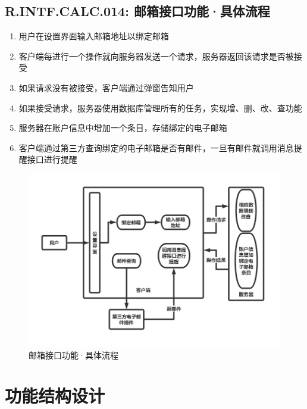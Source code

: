     \subsection{R.INTF.CALC.014: 邮箱接口功能·具体流程}
    \begin{enumerate}
        \item 用户在设置界面输入邮箱地址以绑定邮箱
        \item 客户端每进行一个操作就向服务器发送一个请求，服务器返回该请求是否被接受
        \item 如果请求没有被接受，客户端通过弹窗告知用户
        \item 如果接受请求，服务器使用数据库管理所有的任务，实现增、删、改、查功能
        \item 服务器在账户信息中增加一个条目，存储绑定的电子邮箱
        \item 客户端通过第三方查询绑定的电子邮箱是否有邮件，一旦有邮件就调用消息提醒接口进行提醒
    \end{enumerate}
        \begin{figure}[h]
            \centering
            \includegraphics[scale=0.4]{OutlineDesign/figures/邮箱接口功能·具体流程.png}
            \caption{邮箱接口功能·具体流程}
            \label{fig:server_flow}
        \end{figure}
\section{功能结构设计}
